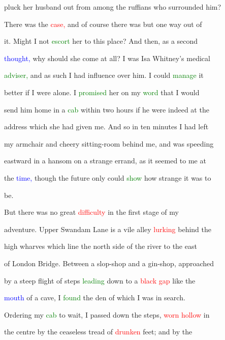  pluck her husband out from among the ruffians who \textcolor{BurntOrange}{surrounded} him?



 There was the \textcolor{red}{case,} and of course there was but one way out of

 it. Might I not \textcolor{green}{escort} her to this place? And then, as a second

 \textcolor{blue}{thought,} why should she come at all? I was Isa Whitney's \textcolor{BurntOrange}{medical}

 \textcolor{green}{adviser,} and as such I had \textcolor{BurntOrange}{influence} over him. I could \textcolor{green}{manage} it

 better if I were alone. I \textcolor{green}{promised} her on my \textcolor{green}{word} that I would

 send him home in a \textcolor{green}{cab} within two hours if he were indeed at the

 address which she had given me. And so in ten minutes I had left

 my armchair and \textcolor{BurntOrange}{cheery} sitting-room behind me, and was speeding

 eastward in a hansom on a strange \textcolor{BurntOrange}{errand,} as it seemed to me at

 the \textcolor{blue}{time,} though the future only could \textcolor{green}{show} how strange it was to

 be.



 But there was no great \textcolor{red}{difficulty} in the first stage of my

 \textcolor{BurntOrange}{adventure.} Upper Swandam Lane is a vile alley \textcolor{red}{lurking} behind the

 high wharves which line the north side of the river to the east

 of London Bridge. Between a slop-shop and a gin-shop, approached

 by a steep flight of steps \textcolor{green}{leading} down to a \textcolor{red}{black} \textcolor{red}{gap} like the

 \textcolor{blue}{mouth} of a cave, I \textcolor{green}{found} the den of which I was in search.

 Ordering my \textcolor{green}{cab} to \textcolor{BurntOrange}{wait,} I passed down the steps, \textcolor{red}{worn} \textcolor{red}{hollow} in

 the centre by the ceaseless tread of \textcolor{red}{drunken} feet; and by the

